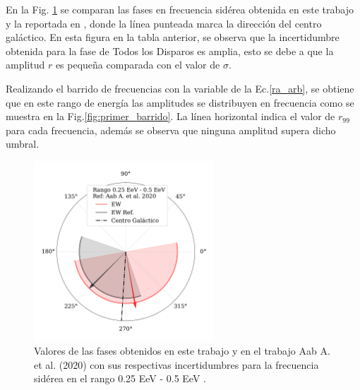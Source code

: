 En la Fig. \ref{fig:primer} se comparan las  fases en frecuencia sidérea obtenida en este trabajo y la reportada en \cite{Aab_2020}, donde la línea punteada marca la dirección del centro galáctico.  En esta figura en la tabla anterior, se observa que la incertidumbre obtenida para la fase de Todos los Disparos es amplia, esto se debe a que la amplitud $r$ es pequeña comparada con el valor de $\sigma$. 


Realizando el barrido de frecuencias con la variable de la Ec.\ref{ra_arb}, se obtiene que en este rango de energía las amplitudes se  distribuyen en frecuencia como se muestra en la Fig.\ref{fig:primer_barrido}. La línea horizontal indica el valor de $r_{99}$ para cada frecuencia, además se observa que ninguna amplitud supera dicho umbral.

\begin{figure}[H]
    \begin{small}
        \begin{center}
            \includegraphics[width=0.6\textwidth]{phase_primer_bin_v3.pdf}
            \vspace*{-1 cm}
        \end{center}
        \caption{Valores de las fases obtenidos en este trabajo y en el trabajo Aab A. et al. (2020) con sus respectivas incertidumbres para la frecuencia sidérea en el  rango 0.25 EeV - 0.5 EeV .}
        \label{fig:primer}
    \end{small}
\end{figure}

